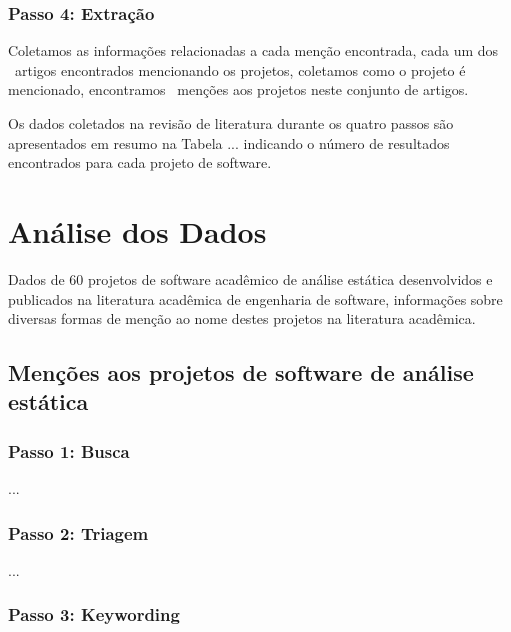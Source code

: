 
\subsubsection{Passo 4: Extração}

Coletamos as informações relacionadas a cada menção encontrada, cada um dos
\ScreeningUniqueCount \ artigos encontrados mencionando os projetos, coletamos
como o projeto é mencionado, encontramos \ScreeningCount \ menções aos
projetos neste conjunto de artigos.

Os dados coletados na revisão de literatura durante os quatro passos são
apresentados em resumo na Tabela ... indicando o
número de resultados encontrados para cada projeto de software.
%

\section{Análise dos Dados} %

Dados de 60 projetos de software acadêmico de análise estática desenvolvidos e
publicados na literatura acadêmica de engenharia de software, informações sobre
diversas formas de menção ao nome destes projetos na literatura acadêmica.

\subsection{Menções aos projetos de software de análise estática}

\subsubsection{Passo 1: Busca}

...

\subsubsection{Passo 2: Triagem}

...

\subsubsection{Passo 3: Keywording}


